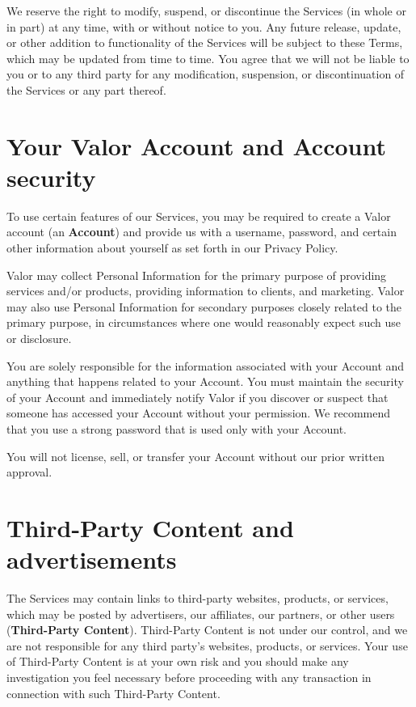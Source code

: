\documentclass[10pt]{article}
\begin{document}
We reserve the right to modify, suspend, or discontinue the Services (in whole or in part) at any time, with or without notice to you. Any future release, update, or other addition to functionality of the Services will be subject to these Terms, which may be updated from time to time. You agree that we will not be liable to you or to any third party for any modification, suspension, or discontinuation of the Services or any part thereof.


\section{Your Valor Account and Account security}
To use certain features of our Services, you may be required to create a Valor account (an \textbf{Account}) and provide us with a username, password, and certain other information about yourself as set forth in our Privacy Policy.

Valor may collect Personal Information for the primary purpose of providing services and/or products, providing information to clients, and marketing. Valor may also use Personal Information for secondary purposes closely related to the primary purpose, in circumstances where one would reasonably expect such use or disclosure.

You are solely responsible for the information associated with your Account and anything that happens related to your Account. You must maintain the security of your Account and immediately notify Valor if you discover or suspect that someone has accessed your Account without your permission. We recommend that you use a strong password that is used only with your Account.

You will not license, sell, or transfer your Account without our prior written approval.


\section{Third-Party Content and advertisements}
The Services may contain links to third-party websites, products, or services, which may be posted by advertisers, our affiliates, our partners, or other users (\textbf{Third-Party Content}). Third-Party Content is not under our control, and we are not responsible for any third party's websites, products, or services. Your use of Third-Party Content is at your own risk and you should make any investigation you feel necessary before proceeding with any transaction in connection with such Third-Party Content.
\end{document}
